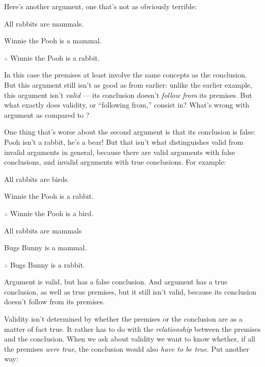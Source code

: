 Here's another argument, one that's not as obviously terrible:
\begin{earg}
\item[\ex{exarg2}]All rabbits are mammals.
\item[] Winnie the Pooh is a mammal.
\item[] $\therefore$ Winnie the Pooh is a rabbit.
\end{earg}
In this case the premises at least involve the same concepts as the conclusion.  But this argument still isn't as good as  from earlier: unlike the earlier example, this argument isn't \emph{valid} --- its conclusion doesn't \emph{follow from} its premises.  But what exactly does validity, or ``following from,'' consist in?  What's wrong with argument  as compared to ?

One thing that's worse about the second argument is that its conclusion is false: Pooh isn't a rabbit, he's a bear!  But that isn't what distinguishes valid from invalid arguments in general, because there are valid arguments with false conclusions, and invalid arguments with true conclusions.  For example:
\begin{earg}
\item[\ex{exarg3}]All rabbits are birds.
\item[] Winnie the Pooh is a rabbit.
\item[] $\therefore$ Winnie the Pooh is a bird.
\end{earg}

\begin{earg}
\item[\ex{exarg4}]All rabbits are mammals
\item[] Bugs Bunny is a mammal.
\item[] $\therefore$ Bugs Bunny is a rabbit.
\end{earg}
Argument  is valid, but has a false conclusion.  And argument  has a true conclusion, as well as true premises, but it still isn't valid, because its conclusion doesn't follow from its premises.  

Validity isn't determined by whether the premises or the conclusion are as a matter of fact true.  It rather has to do with the \emph{relationship} between the premises and the conclusion.  When we ask about validity we want to know whether, if all the premises \emph{were true}, the conclusion would also \emph{have to be true}.  Put another way:



